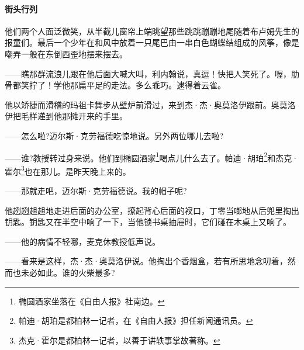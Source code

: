 \paragraph*{街头行列}
\par 他们两个人面泛微笑，从半截儿窗帘上端眺望那些跳跳蹦蹦地尾随着布卢姆先生的报童们。最后一个少年在和风中放着一只尾巴由一串白色蝴蝶结组成的风筝，像是嘲弄一般在东倒西歪地摆来摆去。
\par ——瞧那群流浪儿跟在他后面大喊大叫，利内翰说，真逗！快把人笑死了。喔，肋骨都笑拧了！学他那扁平足的走法。多么乖巧。逮得着云雀。
\par 他以矫捷而滑稽的玛祖卡舞步从壁炉前滑过，来到杰·杰·奥莫洛伊跟前。奥莫洛伊把毛样递到他那摊开来的手里。
\par ——怎么啦?迈尔斯·克劳福德吃惊地说。另外两位哪儿去啦?
\par ——谁?教授转过身来说。他们到椭圆酒家\footnote{椭圆酒家坐落在《自由人报》社南边。}喝点儿什么去了。帕迪·胡珀\footnote{帕迪·胡珀是都柏林一记者，在《自由人报》担任新闻通讯员。}和杰克·霍尔\footnote{杰克·霍尔是都柏林一记者，以善于讲轶事掌故著称。}也在那儿。是昨天晚上来的。
\par ——那就走吧，迈尔斯·克劳福德说。我的帽子呢?
\par 他趔趔趄趄地走进后面的办公室，撩起背心后面的衩口，丁零当啷地从后兜里掏出钥匙。钥匙又在半空中响了一下，当他锁书桌抽屉时，它们碰在木桌上又响了。
\par ——他的病情不轻哪，麦克休教授低声说。
\par ——看来是这样，杰·杰·奥莫洛伊说。他掏出个香烟盒，若有所思地念叨着，然而也未必如此。谁的火柴最多?
